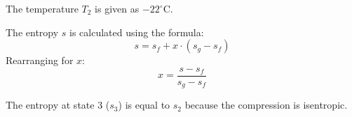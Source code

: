 The temperature \( T_2 \) is given as \( -22^\circ\text{C} \).  

The entropy \( s \) is calculated using the formula:  
\[
s = s_f + x \cdot (s_g - s_f)
\]  
Rearranging for \( x \):  
\[
x = \frac{s - s_f}{s_g - s_f}
\]  

The entropy at state 3 (\( s_3 \)) is equal to \( s_2 \) because the compression is isentropic.